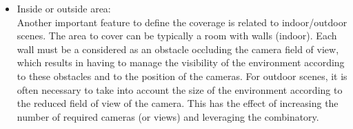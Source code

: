 \begin{itemize}
\item Inside or outside area:\\ 
Another important feature to define the coverage is related to indoor/outdoor scenes. The area to cover can be typically a room with walls (indoor). Each wall must be a considered as an obstacle occluding the camera field of view,  which results in having to manage the visibility of the environment according to these obstacles and to the position of the cameras. For outdoor scenes, it is often necessary to take into account the size of the environment according to the reduced field of view of the camera. This has the effect of increasing the number of required cameras (or views) and leveraging the combinatory. 

   
\end{itemize}
  

